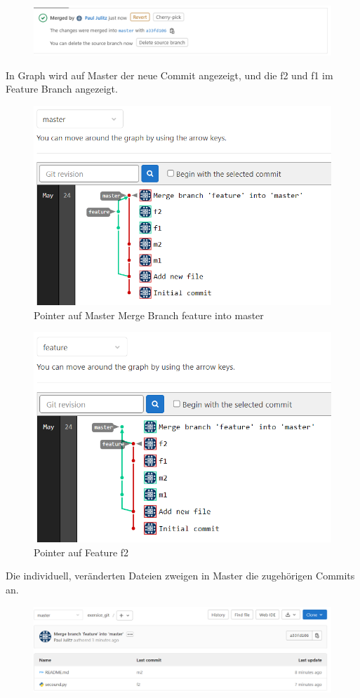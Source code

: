 \begin{figure}[H]
	\centering
	\includegraphics[width=0.7\linewidth]{attachment/chapter_5/Scc021}
\end{figure}

In Graph wird auf Master der neue Commit angezeigt, und die f2 und f1 im Feature Branch angezeigt.

\begin{figure}[H]
	\centering
	\includegraphics[width=0.7\linewidth]{attachment/chapter_5/Scc022}
	\caption{Pointer auf Master Merge Branch feature into master}
\end{figure}

\begin{figure}[H]
	\centering
	\includegraphics[width=0.7\linewidth]{attachment/chapter_5/Scc023}
	\caption{Pointer auf Feature f2}
\end{figure}

Die individuell, veränderten Dateien zweigen in Master die zugehörigen Commits an.

\begin{figure}[H]
	\centering
	\includegraphics[width=0.7\linewidth]{attachment/chapter_5/Scc024}
\end{figure}

